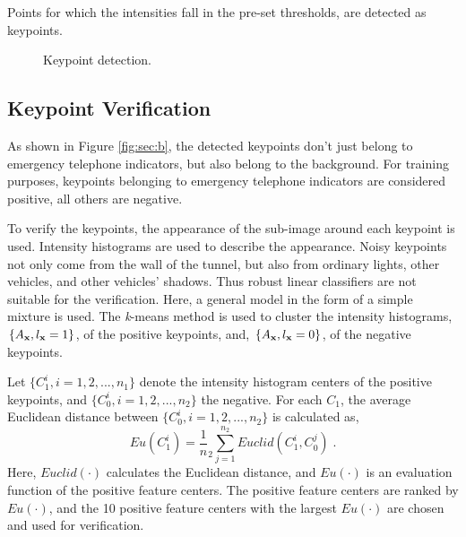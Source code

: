 \documentclass{JoITSRstyle}
\begin{document}
Points for which the intensities fall in the pre-set thresholds, are detected as keypoints.
\begin{figure}
\centering
{}
\caption{Keypoint detection. }
\label{fig:sec}
\end{figure}
\subsection{Keypoint Verification}
As shown in Figure \ref{fig:sec:b}, the detected keypoints don't just belong to emergency telephone indicators, but also belong to the background. For training purposes, keypoints belonging to emergency telephone indicators are considered  positive, all others are negative.

To verify the keypoints, the appearance of the sub-image around each keypoint is used. Intensity histograms are used to describe the appearance. Noisy keypoints not only come from the wall of the tunnel, but also from ordinary lights, other vehicles, and other vehicles' shadows. Thus robust linear classifiers are not suitable for the verification. Here, a general model in the form of a simple mixture is used. The \emph{k}-means method is used to cluster the intensity histograms, $\{A_{\bf{x}},l_{\bf{x}}=1\}$, of the positive keypoints, and, $\{A_{\bf{x}},l_{\bf{x}}=0\}$,  of
the negative keypoints.

Let $\{C_1^i,i=1,2,...,n_1\}$ denote the intensity histogram centers of the positive keypoints, and $\{C_0^i,i=1,2,...,n_2\}$ the negative. For each $C_1$, the average Euclidean distance between $\{C_0^i,i=1,2,...,n_2\}$ is calculated as,
\begin{equation}
Eu(C_1^i)={\frac 1 n_2}\sum\limits^{n_2}_{j=1}Euclid(C_1^i,C_0^j)\;.
\label{eq2}
\end{equation}
Here, $Euclid(\cdot)$ calculates the Euclidean distance, and $Eu(\cdot)$ is an evaluation function of the positive feature centers. The positive feature centers are ranked by $Eu(\cdot)$, and the 10 positive feature centers with the largest $Eu(\cdot)$ are chosen and used for verification.
\end{document}
